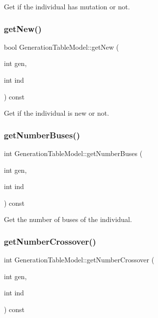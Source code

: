Get if the individual has mutation or not. 

\mbox{\label{class_generation_table_model_a8c771dcf22a7d54e77321584e3bbe065}} 
\subsubsection{\texorpdfstring{get\+New()}{getNew()}}
{\footnotesize\ttfamily bool Generation\+Table\+Model\+::get\+New (\begin{DoxyParamCaption}\item[{int}]{gen,  }\item[{int}]{ind }\end{DoxyParamCaption}) const}



Get if the individual is new or not. 

\mbox{\label{class_generation_table_model_a01e8f13d7dee94267b57b287b67773cb}} 
\subsubsection{\texorpdfstring{get\+Number\+Buses()}{getNumberBuses()}}
{\footnotesize\ttfamily int Generation\+Table\+Model\+::get\+Number\+Buses (\begin{DoxyParamCaption}\item[{int}]{gen,  }\item[{int}]{ind }\end{DoxyParamCaption}) const}



Get the number of buses of the individual. 

\mbox{\label{class_generation_table_model_ac34258da2589b7cef71d6f8067b3c795}} 
\subsubsection{\texorpdfstring{get\+Number\+Crossover()}{getNumberCrossover()}}
{\footnotesize\ttfamily int Generation\+Table\+Model\+::get\+Number\+Crossover (\begin{DoxyParamCaption}\item[{int}]{gen,  }\item[{int}]{ind }\end{DoxyParamCaption}) const}



